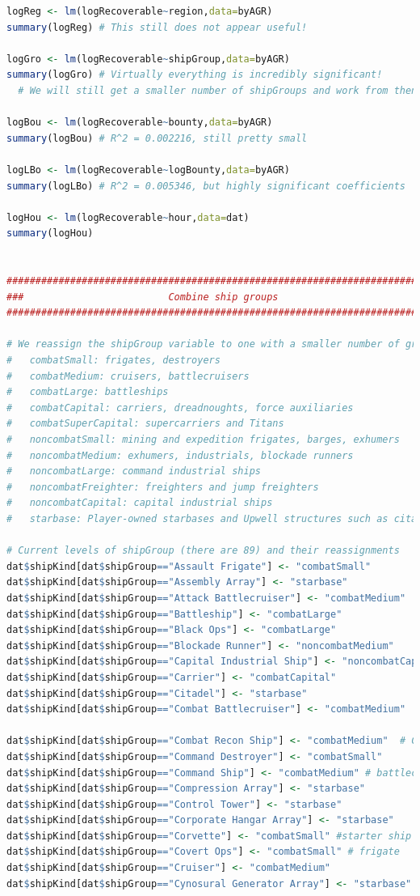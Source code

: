 \documentclass[letterpaper,12pt,article]{memoir}
\begin{document}
{\begin{lstlisting}[language=R]
logReg <- lm(logRecoverable~region,data=byAGR)
summary(logReg) # This still does not appear useful!

logGro <- lm(logRecoverable~shipGroup,data=byAGR)
summary(logGro) # Virtually everything is incredibly significant!
  # We will still get a smaller number of shipGroups and work from thence

logBou <- lm(logRecoverable~bounty,data=byAGR)
summary(logBou) # R^2 = 0.002216, still pretty small

logLBo <- lm(logRecoverable~logBounty,data=byAGR)
summary(logLBo) # R^2 = 0.005346, but highly significant coefficients

logHou <- lm(logRecoverable~hour,data=dat)
summary(logHou)


###############################################################################
###                         Combine ship groups                             ###
###############################################################################

# We reassign the shipGroup variable to one with a smaller number of groups:
#   combatSmall: frigates, destroyers
#   combatMedium: cruisers, battlecruisers
#   combatLarge: battleships
#   combatCapital: carriers, dreadnoughts, force auxiliaries
#   combatSuperCapital: supercarriers and Titans
#   noncombatSmall: mining and expedition frigates, barges, exhumers
#   noncombatMedium: exhumers, industrials, blockade runners
#   noncombatLarge: command industrial ships
#   noncombatFreighter: freighters and jump freighters
#   noncombatCapital: capital industrial ships
#   starbase: Player-owned starbases and Upwell structures such as citadels

# Current levels of shipGroup (there are 89) and their reassignments
dat$shipKind[dat$shipGroup=="Assault Frigate"] <- "combatSmall"
dat$shipKind[dat$shipGroup=="Assembly Array"] <- "starbase"
dat$shipKind[dat$shipGroup=="Attack Battlecruiser"] <- "combatMedium"
dat$shipKind[dat$shipGroup=="Battleship"] <- "combatLarge"
dat$shipKind[dat$shipGroup=="Black Ops"] <- "combatLarge"
dat$shipKind[dat$shipGroup=="Blockade Runner"] <- "noncombatMedium"
dat$shipKind[dat$shipGroup=="Capital Industrial Ship"] <- "noncombatCapital"
dat$shipKind[dat$shipGroup=="Carrier"] <- "combatCapital"
dat$shipKind[dat$shipGroup=="Citadel"] <- "starbase"
dat$shipKind[dat$shipGroup=="Combat Battlecruiser"] <- "combatMedium"

dat$shipKind[dat$shipGroup=="Combat Recon Ship"] <- "combatMedium"  # Cruiser
dat$shipKind[dat$shipGroup=="Command Destroyer"] <- "combatSmall"
dat$shipKind[dat$shipGroup=="Command Ship"] <- "combatMedium" # battlecruiser
dat$shipKind[dat$shipGroup=="Compression Array"] <- "starbase"
dat$shipKind[dat$shipGroup=="Control Tower"] <- "starbase"
dat$shipKind[dat$shipGroup=="Corporate Hangar Array"] <- "starbase"
dat$shipKind[dat$shipGroup=="Corvette"] <- "combatSmall" #starter ship
dat$shipKind[dat$shipGroup=="Covert Ops"] <- "combatSmall" # frigate
dat$shipKind[dat$shipGroup=="Cruiser"] <- "combatMedium"
dat$shipKind[dat$shipGroup=="Cynosural Generator Array"] <- "starbase"


\end{lstlisting}}
\end{document}
